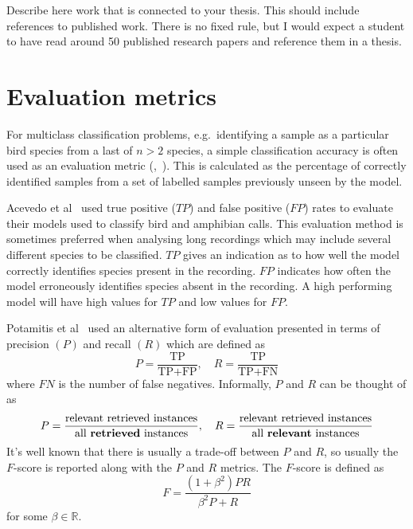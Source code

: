 Describe here work that is connected to your thesis. This should include
references to published work. There is no fixed rule, but I would expect a
student to have read around 50 published research papers and reference them in a
thesis.

\section{Evaluation metrics}

For multiclass classification problems, e.g.\ identifying a sample as a
particular bird species from a last of $n > 2$ species, a simple classification
accuracy is often used as an evaluation metric
(\cite{chakraborty2016bird},~\cite{ramashini2022robust}). This is calculated as
the percentage of correctly identified samples from a set of labelled samples
previously unseen by the model.

Acevedo et al~\cite{acevedo2009automated} used true positive ($TP$) and false
positive ($FP$) rates to evaluate their models used to classify bird and amphibian
calls. This evaluation method is sometimes preferred when analysing long
recordings which may include several different species to be classified. $TP$
gives an indication as to how well the model correctly identifies species
present in the recording. $FP$ indicates how often the model erroneously
identifies species absent in the recording. A high performing model will have
high values for $TP$ and low values for $FP$\@.

Potamitis et al~\cite{potamitis2014automatic} used an alternative form of
evaluation presented in terms of precision $(P)$ and recall $(R)$ which are
defined as
\begin{equation}
  P = \frac{\text{TP}}{\text{TP}+\text{FP}}, \hspace{1em}
  R = \frac{\text{TP}}{\text{TP}+\text{FN}}
\end{equation}
where $FN$ is the number of false negatives. Informally, $P$ and $R$ can be
thought of as
\begin{equation}
  P = \frac{\text{relevant retrieved instances}}{\text{all \textbf{retrieved} instances}}, \hspace{1em}
  R = \frac{\text{relevant retrieved instances}}{\text{all \textbf{relevant} instances}}
\end{equation}
It's well known that there is usually a trade-off between $P$ and $R$, so
usually the $F$-score is reported along with the $P$ and $R$ metrics. The
$F$-score is defined as
\begin{equation}
F = \frac{(1+\beta^2)PR}{\beta^2P + R}
\end{equation}
for some $\beta \in \mathbb{R}$.


